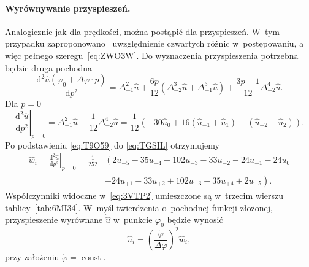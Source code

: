 \documentclass[paper=a4,DIV=12]{tmmlab}
\newcommand{\odn}[3]{\frac{\mathrm{d}^{#1}#2}{\mathrm{d}{#3}^{#1}}}
\begin{document}
\begin{appendices}
  \paragraph{Wyrównywanie przyspieszeń.} Analogicznie jak dla prędkości, można
  postąpić dla przyspieszeń. W~tym przypadku
  zaproponowano~\cite{oderfeld:1958:opewnym} uwzględnienie czwartych różnic
  w~postępowaniu, a więc pełnego szeregu~\eqref{eq:ZWO3W}. Do wyznaczenia
  przyspieszenia potrzebna będzie druga pochodna
  \begin{equation}
    \odn{2}{\hat{u}(\varphi_0 + \Delta\varphi \cdot p)}{p}
      = \Delta_{-1}^2 \hat{u}
      + \frac{6 p}{12} \left(\Delta_{-2}^3\hat{u} + \Delta_{-1}^3\hat{u}\right)
      + \frac{3p - 1}{12}\Delta_{-2}^4\hat{u}.
    \label{eq:LCVAJ}
  \end{equation}
  Dla $p=0$
  \begin{equation}
    \left.\odn{2}{\hat{u}}{p}\right|_{p=0}
      = \Delta_{-1}^2 \hat{u}
      - \frac{1}{12}\Delta_{-2}^4\hat{u}
      = \frac{1}{12}\left(-30 \hat{u}_0 + 16 (\hat{u}_{-1} + \hat{u}_1) - (\hat{u}_{-2} + \hat{u}_2)\right).
    \label{eq:TGSIL}
  \end{equation}
  Po podstawieniu \eqref{eq:T9O59} do \eqref{eq:TGSIL} otrzymujemy
  \begin{equation}
    \begin{aligned}
      \hat{w}_i = \left.\odn{2}{\hat{u}}{p}\right|_{p=0}
      = \frac{1}{252} & \left(
         2 u_{-5}
       -35 u_{-4}
      +102 u_{-3}
       -33 u_{-2}
       -24 u_{-1}
       -24 u_0
       \right. \\ & \left.
       -24 u_{+1}
       -33 u_{+2}
      +102 u_{+3}
       -35 u_{+4}
        +2 u_{+5}
    \right).
    \end{aligned}
    \label{eq:3VTP2}
  \end{equation}
  Współczynniki widoczne w~\eqref{eq:3VTP2} umieszczone są w~trzecim wierszu
  tablicy~\ref{tab:6MI34}. W~myśl twierdzenia o~pochodnej funkcji złożonej,
  przyspieszenie wyrównane $\ddot{\hat{u}}$ w~punkcie $\varphi_0$ będzie
  wynosić
  \begin{equation}
    \ddot{\hat{u}}_i = \left(\frac{\dot{\varphi}}{\Delta\varphi}\right)^2 \hat{w}_i,
    \label{eq:0419L}
  \end{equation}
  przy założeniu $\dot\varphi = \operatorname{const}$.


\end{appendices}
\end{document}
